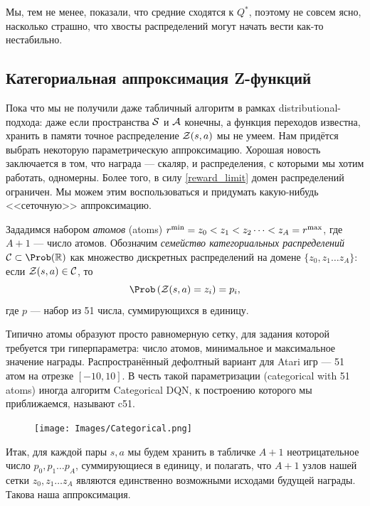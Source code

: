 Мы, тем не менее, показали, что средние сходятся к $Q^*$, поэтому не совсем ясно, насколько страшно, что хвосты распределений могут начать вести как-то нестабильно.

\subsection{Категориальная аппроксимация Z-функций}

Пока что мы не получили даже табличный алгоритм в рамках distributional-подхода: даже если пространства $\mathcal{S}$ и $\mathcal{A}$ конечны, а функция переходов известна, хранить в памяти точное распределение $\mathcal{Z}(s, a)$ мы не умеем. Нам придётся выбрать некоторую параметрическую аппроксимацию. Хорошая новость заключается в том, что награда --- скаляр, и распределения, с которыми мы хотим работать, одномерны. Более того, в силу \eqref{reward_limit} домен распределений ограничен. Мы можем этим воспользоваться и придумать какую-нибудь <<сеточную>> аппроксимацию.

\begin{definition}
Зададимся набором \emph{атомов} (atoms) $r^{\min} \HM= z_0 \HM< z_1 \HM< z_2 \dots < z_A \HM= r^{\max}$, где $A + 1$ --- число атомов. Обозначим \emph{семейство категориальных распределений} $\mathcal{C} \subset \Prob(\R)$ как множество дискретных распределений на домене $\{z_0, z_1 \dots z_A\}$: если $\Z(s, a) \HM\in \mathcal{C}$, то
$$\Prob \left( \Z(s, a) = z_i \right) = p_i,$$
где $p$ --- набор из 51 числа, суммирующихся в единицу.
\end{definition}

\begin{example}[c51]
Типично атомы образуют просто равномерную сетку, для задания которой требуется три гиперпараметра: число атомов, минимальное и максимальное значение награды. Распространённый дефолтный вариант для Atari игр --- 51 атом на отрезке $[-10, 10]$. В честь такой параметризации (categorical with 51 atoms) иногда алгоритм Categorical DQN, к построению которого мы приближаемся, называют c51.
\end{example}

\begin{figure}
\vspace{-0.3cm}
\centering
\texttt{[image: Images/Categorical.png]}
\vspace{-0.6cm}
\end{figure}
Итак, для каждой пары $s, a$ мы будем хранить в табличке $A + 1$ неотрицательное число $p_0, p_1 \dots p_A$, суммирующиеся в единицу, и полагать, что $A+1$ узлов нашей сетки $z_0, z_1 \dots z_A$ являются единственно возможными исходами будущей награды. Такова наша аппроксимация.

